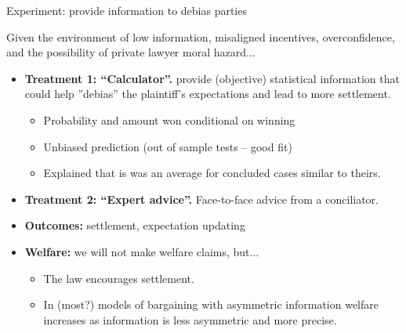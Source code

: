 \documentclass[9pt]{beamer}
\begin{document}
\begin{frame}{Experiment: provide information to debias parties}

    Given the environment of low information, misaligned incentives, overconfidence, and the possibility of private lawyer moral hazard...
        \vspace{0.1in}
        
    \begin{itemize}
        \item \textbf{Treatment 1: ``Calculator''.} provide (objective) statistical information that could help ''debias'' the plaintiff's expectations and lead to more settlement.
          \begin{itemize}
              \item Probability and amount won conditional on winning
              \item Unbiased prediction (out of sample tests -- good fit)
              \item Explained that is was an average for concluded cases similar to theirs.
          \end{itemize}
        \vspace{0.1in}
        \item \textbf{Treatment 2: ``Expert advice''.} Face-to-face advice from a conciliator.
        \vspace{0.1in}
        \item{\textbf{Outcomes:} settlement, expectation updating}
         \vspace{0.1in}
        \item \textbf{Welfare:} we will not make welfare claims, but...
            \begin{itemize}
                \item The law encourages settlement.
                \item In (most?) models of bargaining with asymmetric information welfare increases as information is less asymmetric and more precise.
            \end{itemize}
    \end{itemize}
\end{frame}
\end{document}
